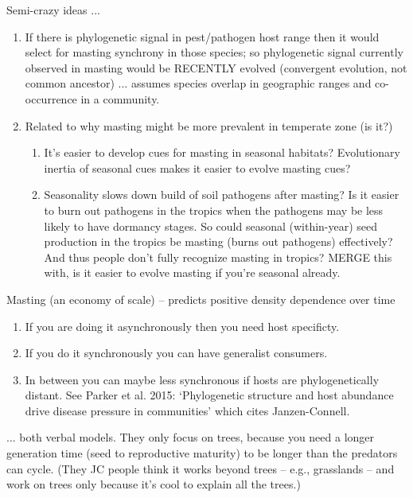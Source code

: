 \documentclass[11pt]{article}
\begin{document}
Semi-crazy ideas ... 
\begin{enumerate}
\item If there is phylogenetic signal in pest/pathogen host range then it would select for masting synchrony in those species; so phylogenetic signal currently observed in masting would be RECENTLY evolved (convergent evolution, not common ancestor) ... assumes species overlap in geographic ranges and co-occurrence in a community. 
\item Related to why masting might be more prevalent in temperate zone (is it?) 
\begin{enumerate}
\item  It's easier to develop cues for masting in seasonal habitats? Evolutionary inertia of seasonal cues makes it easier to evolve masting cues? 
\item Seasonality slows down build of soil pathogens after masting? Is it easier to burn out pathogens in the tropics when the pathogens may be less likely to have dormancy stages. So could seasonal (within-year) seed production in the tropics be masting (burns out pathogens) effectively? And thus people don't fully recognize masting in tropics? MERGE this with, is it easier to evolve masting if you're seasonal already.
\end{enumerate}
\end{enumerate}

Masting (an economy of scale) -- predicts positive density dependence over time  
\begin{enumerate}
\item If you are doing it asynchronously then you need host specificty.
\item If you do it synchronously you can have generalist consumers.
\item In between you can maybe less synchronous if hosts are phylogenetically distant. See Parker et al. 2015: `Phylogenetic structure and host abundance drive disease pressure in communities' which cites Janzen-Connell. 
\end{enumerate}

... both verbal models. They only focus on trees, because you need a longer generation time (seed to reproductive maturity) to be longer than the predators can cycle. (They JC people think it works beyond trees -- e.g., grasslands -- and work on trees only because it's cool to explain all the trees.)

\end{document}
